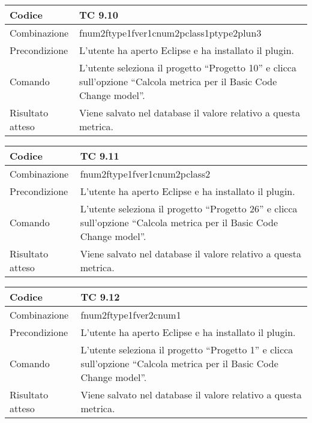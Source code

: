 \begin{table}[ht]
\begin{tabular}{|p{3cm}|p{9cm}|}
\hline
\cellcolor{lightgray}Codice				& TC 9.10								\\
\hline
\cellcolor{lightgray}Combinazione		& fnum2ftype1fver1cnum2pclass1ptype2plun3									\\
\hline
\cellcolor{lightgray}Precondizione		& L'utente ha aperto Eclipse e ha installato il plugin.		\\
\hline
\cellcolor{lightgray}Comando			& L'utente seleziona il progetto ``Progetto 10''  e clicca sull'opzione ``Calcola metrica per il Basic Code Change model''.	\\
\hline
\cellcolor{lightgray}Risultato atteso	& Viene salvato nel database il valore relativo a questa metrica.\\
\hline
\end{tabular}
\end{table}


\begin{table}[ht]
\begin{tabular}{|p{3cm}|p{9cm}|}
\hline
\cellcolor{lightgray}Codice				& TC 9.11								\\
\hline
\cellcolor{lightgray}Combinazione		& fnum2ftype1fver1cnum2pclass2									\\
\hline
\cellcolor{lightgray}Precondizione		& L'utente ha aperto Eclipse e ha installato il plugin.		\\
\hline
\cellcolor{lightgray}Comando			& L'utente seleziona il progetto ``Progetto 26''  e clicca sull'opzione ``Calcola metrica per il Basic Code Change model''.	\\
\hline
\cellcolor{lightgray}Risultato atteso	& Viene salvato nel database il valore relativo a questa metrica.\\
\hline
\end{tabular}
\end{table}

\clearpage

\begin{table}[ht]
\begin{tabular}{|p{3cm}|p{9cm}|}
\hline
\cellcolor{lightgray}Codice				& TC 9.12								\\
\hline
\cellcolor{lightgray}Combinazione		& fnum2ftype1fver2cnum1									\\
\hline
\cellcolor{lightgray}Precondizione		& L'utente ha aperto Eclipse e ha installato il plugin.		\\
\hline
\cellcolor{lightgray}Comando			& L'utente seleziona il progetto ``Progetto 1''  e clicca sull'opzione ``Calcola metrica per il Basic Code Change model''.	\\
\hline
\cellcolor{lightgray}Risultato atteso	& Viene salvato nel database il valore relativo a questa metrica.\\
\hline
\end{tabular}
\end{table}


